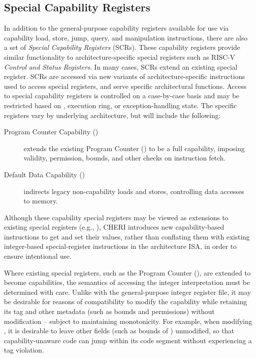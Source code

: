 \subsection{Special Capability Registers}
\label{section:special-capability-registers}

In addition to the general-purpose capability registers available for use via
capability load, store, jump, query, and manipulation instructions, there are
also a set of \textit{Special Capability Registers} (SCRs).
These capability registers provide similar functionality to
architecture-specific special registers such as RISC-V \textit{Control
  and Status Registers}.  In many cases, SCRs extend an existing
special register.
SCRs are accessed via new variants of architecture-specific
instructions used to access special registers, and serve specific
architectural functions.
Access to special capability registers is controlled on a case-by-case basis
and may be restricted based on \cappermASR, execution ring, or
exception-handling state.
The specific registers vary by underlying architecture, but will include the
following:

\begin{description}
\item[Program Counter Capability (\PCC{})] extends the existing Program
  Counter (\PC{}) to be a full capability, imposing validity, permission,
  bounds, and other checks on instruction fetch.

\item[Default Data Capability (\DDC{})] indirects legacy non-capability loads
  and stores, controlling data accesses to memory.
\end{description}

Although these capability special registers may be viewed as extensions to
existing special registers (e.g., \PC{}), CHERI introduces new
capability-based instructions to get and set their values, rather than
conflating them with existing integer-based special-register instructions in
the architecture ISA, in order to ensure intentional use.

Where existing special registers, such as the Program Counter (\PC{}),
are extended to become capabilities, the
semantics of accessing the integer interpretation must be determined with
care.
Unlike with the general-purpose integer register file, it may be desirable for
reasons of compatibility to modify the capability while retaining its tag
and other metadata (such as bounds and permissions) without modification --
subject to maintaining monotonicity.
For example, when modifying \PC{}, it is desirable to leave other fields (such
as bounds of \PCC{}) unmodified, so that
capability-unaware code can jump within its code segment without experiencing
a tag violation.

